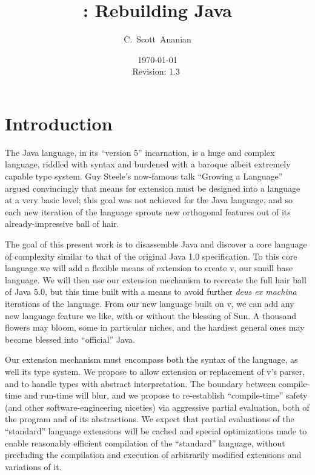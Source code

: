 \documentclass[11pt,notitlepage,twocolumn]{article}
\author{C.~Scott~Ananian}
\title{\vlang: Rebuilding Java}
\date{\today \\ $ $Revision: 1.3 $ $}
\newcommand{\vlang}{\textsf{v}\xspace}
\begin{document}

\maketitle

\section{Introduction}
The Java language, in its ``version 5'' incarnation, is a huge and
complex language, riddled with syntax and burdened with a baroque
albeit extremely capable type system.  Guy Steele's now-famous talk
``Growing a Language'' \cite{Steele99} argued convincingly that means
for extension must be designed into a language at a very basic level;
this goal was not achieved for the Java language, and so each new
iteration of the language sprouts new orthogonal features out of its
already-impressive ball of hair.

The goal of this present work is to disassemble Java and discover a
core language of complexity similar to that of the original Java
1.0 specification.  To this core language we will add a flexible means
of extension to create \vlang, our small base language.  We will then use
our extension mechanism to recreate the full hair ball of Java 5.0,
but this time built with a means to avoid further \emph{deus ex
  machina} iterations of the language.  From our new language built on
\vlang, we can add any new language feature we like, with or without the
blessing of Sun.  A thousand flowers may bloom, some in particular
niches, and the hardiest general ones may become blessed into
``official'' Java.

Our extension mechanism must encompass both the syntax of the
language, as well its type system.  We propose to allow extension or
replacement of \vlang's parser, and to handle types with abstract
interpretation.  The boundary between compile-time and run-time will
blur, and we propose to re-establish ``compile-time'' safety (and
other software-engineering niceties) via aggressive partial
evaluation, both of the program and of its abstractions.  We expect
that partial evaluations of the ``standard'' language extensions will
be cached and special optimizations made to enable reasonably
efficient compilation of the ``standard'' language, without precluding
the compilation and execution of arbitrarily modified extensions and
variations of it.
\end{document}
